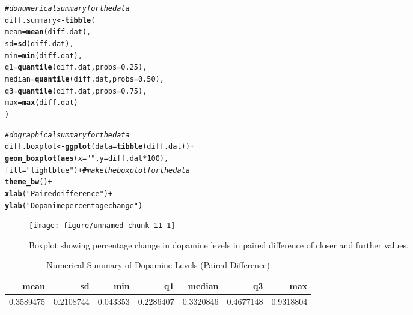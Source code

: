 \documentclass{article}\usepackage[]{graphicx}\usepackage[]{xcolor}
\makeatletter
\def\maxwidth{ %
  \ifdim\Gin@nat@width>\linewidth
    \linewidth
  \else
    \Gin@nat@width
  \fi
}
\newcommand{\hlnum}[1]{\textcolor[rgb]{0.686,0.059,0.569}{#1}}%
\newcommand{\hlsng}[1]{\textcolor[rgb]{0.192,0.494,0.8}{#1}}%
\newcommand{\hlcom}[1]{\textcolor[rgb]{0.678,0.584,0.686}{\textit{#1}}}%
\newcommand{\hlopt}[1]{\textcolor[rgb]{0,0,0}{#1}}%
\newcommand{\hldef}[1]{\textcolor[rgb]{0.345,0.345,0.345}{#1}}%
\newcommand{\hlkwb}[1]{\textcolor[rgb]{0.69,0.353,0.396}{#1}}%
\newcommand{\hlkwc}[1]{\textcolor[rgb]{0.333,0.667,0.333}{#1}}%
\newcommand{\hlkwd}[1]{\textcolor[rgb]{0.737,0.353,0.396}{\textbf{#1}}}%
\newenvironment{kframe}{%
 \def\at@end@of@kframe{}%
 \ifinner\ifhmode%
  \def\at@end@of@kframe{\end{minipage}}%
  \begin{minipage}{\columnwidth}%
 \fi\fi%
 \def\FrameCommand##1{\hskip\@totalleftmargin \hskip-\fboxsep
 \colorbox{shadecolor}{##1}\hskip-\fboxsep
     \hskip-\linewidth \hskip-\@totalleftmargin \hskip\columnwidth}%
 \MakeFramed {\advance\hsize-\width
   \@totalleftmargin\z@ \linewidth\hsize
   \@setminipage}}%
 {\par\unskip\endMakeFramed%
 \at@end@of@kframe}
\newenvironment{knitrout}{}{} %
\makeatother
\begin{document}
\begin{enumerate}
\begin{enumerate}
\begin{knitrout}
\begin{kframe}
\begin{alltt}
\hlcom{#do numerical summary for the data}
\hldef{diff.summary} \hlkwb{<-} \hlkwd{tibble}\hldef{(}
\hlkwc{mean} \hldef{=} \hlkwd{mean}\hldef{(diff.dat),}
\hlkwc{sd} \hldef{=} \hlkwd{sd}\hldef{(diff.dat),}
\hlkwc{min} \hldef{=} \hlkwd{min}\hldef{(diff.dat),}
\hlkwc{q1} \hldef{=} \hlkwd{quantile}\hldef{(diff.dat,} \hlkwc{probs} \hldef{=} \hlnum{0.25}\hldef{),}
\hlkwc{median} \hldef{=} \hlkwd{quantile}\hldef{(diff.dat,} \hlkwc{probs} \hldef{=} \hlnum{0.50}\hldef{),}
\hlkwc{q3} \hldef{=} \hlkwd{quantile}\hldef{(diff.dat,} \hlkwc{probs} \hldef{=} \hlnum{0.75}\hldef{),}
\hlkwc{max} \hldef{=} \hlkwd{max}\hldef{(diff.dat)}
\hldef{)}

\hlcom{#do graphical summary for the data}
\hldef{diff.boxplot} \hlkwb{<-} \hlkwd{ggplot}\hldef{(}\hlkwc{data} \hldef{=} \hlkwd{tibble}\hldef{(diff.dat))}\hlopt{+}
\hlkwd{geom_boxplot}\hldef{(}\hlkwd{aes}\hldef{(}\hlkwc{x} \hldef{=} \hlsng{""}\hldef{,} \hlkwc{y} \hldef{= diff.dat}\hlopt{*}\hlnum{100}\hldef{),}
             \hlkwc{fill} \hldef{=} \hlsng{"lightblue"}\hldef{)}\hlopt{+} \hlcom{#make the boxplot for the data}
\hlkwd{theme_bw}\hldef{()}\hlopt{+}
\hlkwd{xlab}\hldef{(}\hlsng{"Paired difference"}\hldef{)}\hlopt{+}
\hlkwd{ylab}\hldef{(}\hlsng{"Dopanime percentage change"}\hldef{)}
\end{alltt}
\end{kframe}
\end{knitrout}

\begin{figure}[H]
\centering
\begin{knitrout}
\color{fgcolor}
\texttt{[image: figure/unnamed-chunk-11-1]} 
\end{knitrout}
\caption{Boxplot showing percentage change in dopamine levels in paired difference of closer and further values.}
\end{figure}
\begin{table}

\caption{\label{tab:unnamed-chunk-12}Numerical Summary of Dopamine Levels (Paired Difference)}
\centering
\begin{tabular}[t]{r|r|r|r|r|r|r}
\hline
mean & sd & min & q1 & median & q3 & max\\
\hline
0.3589475 & 0.2108744 & 0.043353 & 0.2286407 & 0.3320846 & 0.4677148 & 0.9318804\\
\hline
\end{tabular}
\end{table}




\end{enumerate}
\end{enumerate}
\end{document}
